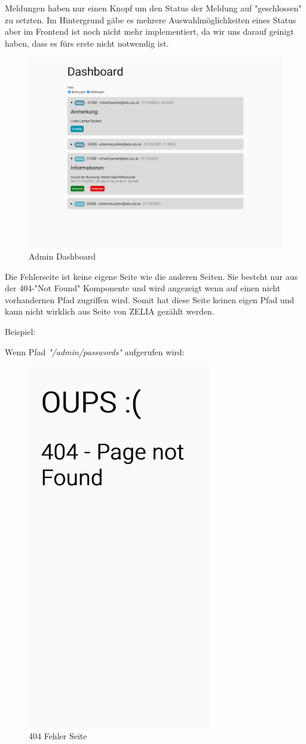 Meldungen haben nur einen Knopf um den Status der Meldung auf "geschlossen" zu setzten. Im Hintergrund gäbe es mehrere Auswahlmöglichkeiten eines Status aber im Frontend ist noch nicht mehr implementiert, da wir uns darauf geinigt haben, dass es fürs erste nicht notwendig ist.

\begin{figure}[H]
    \centering
    \includegraphics[width=120mm]{media/WebComponents/AdminSeite_light.png}
    \caption{Admin Dashboard}
\end{figure}


Die Fehlerseite ist keine eigene Seite wie die anderen Seiten. Sie besteht nur aus der 404-"Not Found" Komponente und wird angezeigt wenn auf einen nicht vorhandernen Pfad zugriffen wird. Somit hat diese Seite keinen eigen Pfad und kann nicht wirklich aus Seite von ZELIA gezählt werden.

Beispiel: 

Wenn Pfad \emph{"/admin/passwords"} aufgerufen wird:

\begin{figure}[H]
    \centering
    \includegraphics[width=80mm]{media/WebComponents/404.png}
    \caption{404 Fehler Seite}
\end{figure}